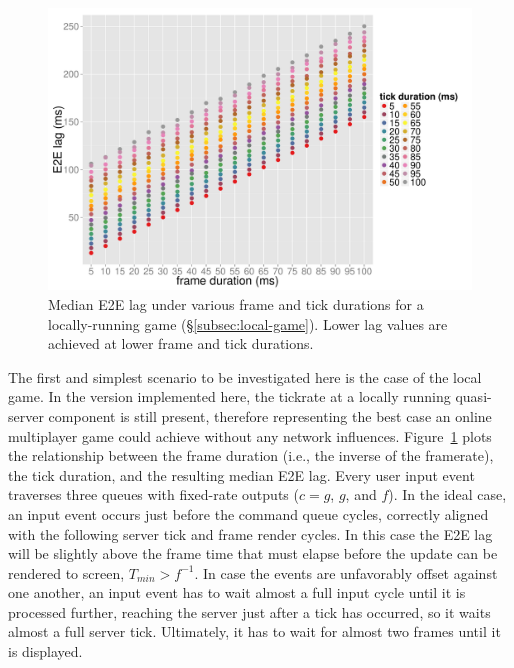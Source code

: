 \begin{figure}[!t]
	\centering
	\includegraphics[width=1.0\columnwidth]{../../../simulation/visualization/nwless-onlinegame-1000rounds.pdf}
	\caption{Median \acrshort{E2E} lag under various frame and tick durations for a locally-running game (§\ref{subsec:local-game}). Lower lag values are achieved at lower frame and tick durations.}
\label{fig:nwless-scatter}
\end{figure}

The first and simplest scenario to be investigated here is the case of the local game. In the version implemented here, the tickrate at a locally running quasi-server component is still present, therefore representing the best case an online multiplayer game could achieve without any network influences. Figure~\ref{fig:nwless-scatter} plots the relationship between the frame duration (i.e., the inverse of the framerate), the tick duration, and the resulting median \gls{E2E} lag. Every user input event traverses three queues with fixed-rate outputs ($c=g$, $g$, and $f$). In the ideal case, an input event occurs just before the command queue cycles, correctly aligned with the following server tick and frame render cycles. In this case the \gls{E2E} lag will be slightly above the frame time that must elapse before the update can be rendered to screen, $T_{min}>f^{-1}$. In case the events are unfavorably offset against one another, an input event has to wait almost a full input cycle until it is processed further, reaching the server just after a tick has occurred, so it waits almost a full server tick. Ultimately, it has to wait for almost two frames until it is displayed.

